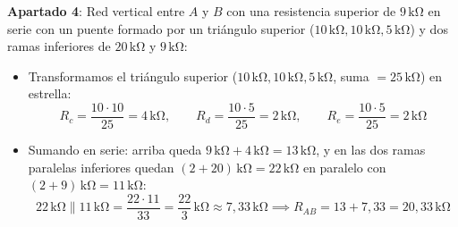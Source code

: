 \begin{ejercicio}
\textbf{Apartado 4}: Red vertical entre $A$ y $B$ con una resistencia superior de $9\,\si{\kilo\ohm}$ en serie con un puente formado por un triángulo superior ($10\,\si{\kilo\ohm}, 10\,\si{\kilo\ohm}, 5\,\si{\kilo\ohm}$) y dos ramas inferiores de $20\,\si{\kilo\ohm}$ y $9\,\si{\kilo\ohm}$:
\begin{itemize}
    \item Transformamos el triángulo superior ($10\,\si{\kilo\ohm}, 10\,\si{\kilo\ohm}, 5\,\si{\kilo\ohm}$, suma $= 25\,\si{\kilo\ohm}$) en estrella:
    \begin{equation*}
        R_c = \frac{10\cdot 10}{25} = 4\,\si{\kilo\ohm}, \qquad R_d = \frac{10\cdot 5}{25} = 2\,\si{\kilo\ohm}, \qquad R_e = \frac{10\cdot 5}{25} = 2\,\si{\kilo\ohm}
    \end{equation*}
    \item Sumando en serie: arriba queda $9\,\si{\kilo\ohm} + 4\,\si{\kilo\ohm} = 13\,\si{\kilo\ohm}$, y en las dos ramas paralelas inferiores quedan $(2 + 20)\,\si{\kilo\ohm} = 22\,\si{\kilo\ohm}$ en paralelo con $(2 + 9)\,\si{\kilo\ohm} = 11\,\si{\kilo\ohm}$:
    \begin{equation*}
        22\,\si{\kilo\ohm} \parallel 11\,\si{\kilo\ohm} = \frac{22\cdot 11}{33} = \frac{22}{3}\,\si{\kilo\ohm} \approx 7{,}33\,\si{\kilo\ohm} \implies \boxed{R_{AB} = 13 + 7{,}33 = 20{,}33\,\si{\kilo\ohm}}
    \end{equation*}
\end{itemize}
\end{ejercicio}


